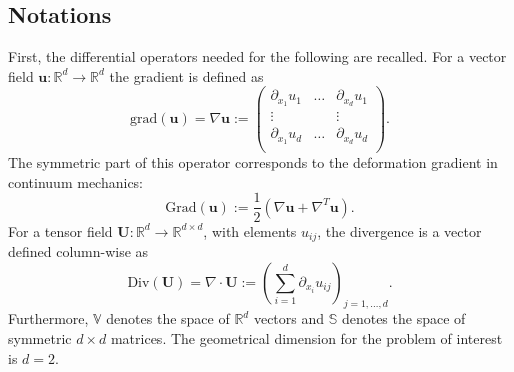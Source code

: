 \documentclass{ifacconf}
\begin{document}
\subsection{Notations}
 First, the differential operators needed for the following are recalled. For a vector field $\bm{u}: \mathbb{R}^d \rightarrow \mathbb{R}^d$ the gradient is defined as 
\begin{equation*}
	\mathrm{grad}(\bm{u}) =  \nabla \bm{u} := \begin{pmatrix}
	\partial_{x_1} u_1 & \dots & \partial_{x_d} u_1 \\
	\vdots & & \vdots \\
	\partial_{x_1} u_d & \dots & \partial_{x_d} u_d \\
	\end{pmatrix}.
\end{equation*}
The symmetric part of this operator corresponds to the deformation gradient in continuum mechanics:
\begin{equation*}
\mathrm{Grad}(\bm{u}) := \frac{1}{2} \left(\nabla \bm{u} + \nabla^T \bm{u} \right).
\end{equation*}
For a tensor field $\bm{U}: \mathbb{R}^d \rightarrow \mathbb{R}^{d \times d}$, with elements $u_{ij}$, the divergence is a vector defined column-wise as
\begin{equation*}
	\mathrm{Div}(\bm U) = \nabla \cdot \bm{U} := \left( \sum_{i = 1}^d \partial_{x_i} u_{ij} \right)_{j = 1, \dots, d}.
\end{equation*}
Furthermore, $\mathbb{V}$ denotes the space of $\mathbb{R}^d$ vectors and $\mathbb{S}$ denotes the space of
symmetric $d \times d$ matrices. The geometrical dimension for the problem of interest is $d=2$.
\end{document}
